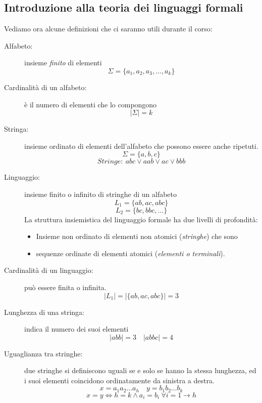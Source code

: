 \subsection{Introduzione alla teoria dei linguaggi formali}
Vediamo ora alcune definizioni che ci saranno utili durante il corso:
\begin{description}
	\item[Alfabeto:] insieme \emph{finito} di elementi
	$$\Sigma = \{a_1, a_2, a_3, \dots, a_k\}$$
	\item[Cardinalità di un alfabeto:]  è il numero di elementi che lo compongono
	$$ |\Sigma| = k $$
	\item[Stringa:] insieme ordinato di elementi dell'alfabeto che possono essere anche ripetuti.
	$$\Sigma = \{a,b,c\}$$
	$$Stringe: \ abc \vee aab \vee ac \vee bbb$$
	\item[Linguaggio:] insieme finito o infinito di stringhe di un alfabeto
	$$L_1 = \{ab,ac,abc\}$$
	$$L_2 = \{bc,bbc,\dots\}$$
	La struttura insiemistica del linguaggio formale ha due livelli di profondità:
	\begin{itemize}
		\item Insieme non ordinato di elementi non atomici (\emph{stringhe}) che sono
		\item sequenze ordinate di elementi atomici (\emph{elementi o terminali}).
	\end{itemize}
	\item[Cardinalità di un linguaggio:] può essere finita o infinita.
	$$|L_1| = |\{ab,ac,abc\}| = 3$$
	\item[Lunghezza di una stringa:] indica il numero dei suoi elementi
	$$|abb| = 3 \quad |abbc| = 4$$
	\item[Uguaglianza tra stringhe:] due stringhe si definiscono uguali se e solo se hanno la stessa lunghezza, ed i suoi elementi coincidono ordinatamente da sinistra a destra.
	$$x = a_1a_2\dots a_h \quad y = b_1b_2\dots b_k$$
	$$x = y \iff h = k \wedge a_i = b_i \ \forall i = 1\to h $$
\end{description}
